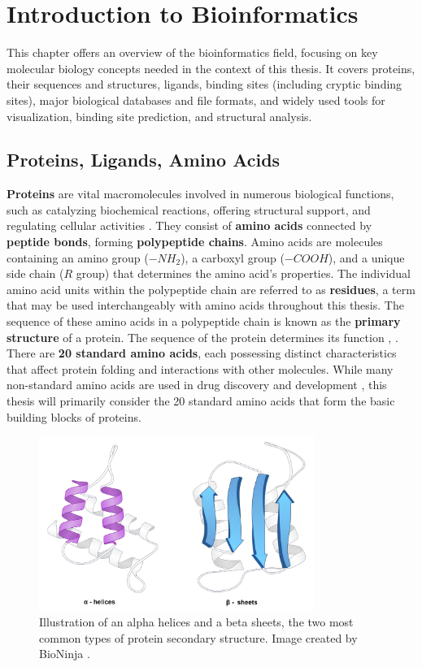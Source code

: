 \chapter{Introduction to Bioinformatics}
\label{chap:intro}

This chapter offers an overview of the bioinformatics field, focusing on key molecular biology concepts needed in the context of this thesis. It covers proteins, their sequences and structures, ligands, binding sites (including cryptic binding sites), major biological databases and file formats, and widely used tools for visualization, binding site prediction, and structural analysis.

\section{Proteins, Ligands, Amino Acids}
\label{sec:proteins}

\textbf{Proteins} are vital macromolecules involved in numerous biological functions, such as catalyzing biochemical reactions, offering structural support, and regulating cellular activities \cite{cooper2022cell}. They consist of \textbf{amino acids} connected by \textbf{peptide bonds}, forming \textbf{polypeptide chains}. Amino acids are molecules containing an amino group (\(-NH_2\)), a carboxyl group (\(-COOH\)), and a unique side chain (\(R\) group) that determines the amino acid's properties. The individual amino acid units within the polypeptide chain are referred to as \textbf{residues}, a term that may be used interchangeably with amino acids throughout this thesis. The sequence of these amino acids in a polypeptide chain is known as the \textbf{primary structure} of a protein. The sequence of the protein determines its function \cite{nelson2008lehninger}, \cite{voet2010biochemistry}. There are \textbf{20 standard amino acids}, each possessing distinct characteristics that affect protein folding and interactions with other molecules. While many non-standard amino acids are used in drug discovery and development \cite{dumas2015designing}, this thesis will primarily consider the 20 standard amino acids that form the basic building blocks of proteins.

\begin{figure}[ht]
    \centering
    \includegraphics[width=0.8\textwidth]{img/ah_bs.png}
    \caption{Illustration of an alpha helices and a beta sheets, the two most common types of protein secondary structure. Image created by BioNinja \cite{alphabetapicture}.}
    \label{fig:alpha-beta}
\end{figure}

